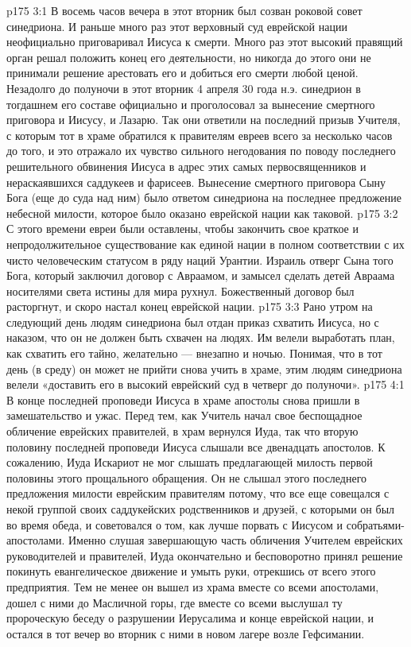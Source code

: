 \vs p175 3:1 В восемь часов вечера в этот вторник был созван роковой совет синедриона. И раньше много раз этот верховный суд еврейской нации неофициально приговаривал Иисуса к смерти. Много раз этот высокий правящий орган решал положить конец его деятельности, но никогда до этого они не принимали решение арестовать его и добиться его смерти любой ценой. Незадолго до полуночи в этот вторник 4 апреля 30 года н.э. синедрион в тогдашнем его составе официально и  проголосовал за вынесение смертного приговора и Иисусу, и Лазарю. Так они ответили на последний призыв Учителя, с которым тот в храме обратился к правителям евреев всего за несколько часов до того, и это отражало их чувство сильного негодования по поводу последнего решительного обвинения Иисуса в адрес этих самых первосвященников и нераскаявшихся саддукеев и фарисеев. Вынесение смертного приговора Сыну Бога (еще до суда над ним) было ответом синедриона на последнее предложение небесной милости, которое было оказано еврейской нации как таковой.
\vs p175 3:2 С этого времени евреи были оставлены, чтобы закончить свое краткое и непродолжительное существование как единой нации в полном соответствии с их чисто человеческим статусом в ряду наций Урантии. Израиль отверг Сына того Бога, который заключил договор с Авраамом, и замысел сделать детей Авраама носителями света истины для мира рухнул. Божественный договор был расторгнут, и скоро настал конец еврейской нации.
\vs p175 3:3 Рано утром на следующий день людям синедриона был отдан приказ схватить Иисуса, но с наказом, что он не должен быть схвачен на людях. Им велели выработать план, как схватить его тайно, желательно --- внезапно и ночью. Понимая, что в тот день (в среду) он может не прийти снова учить в храме, этим людям синедриона велели «доставить его в высокий еврейский суд в четверг до полуночи».
\vs p175 4:1 В конце последней проповеди Иисуса в храме апостолы снова пришли в замешательство и ужас. Перед тем, как Учитель начал свое беспощадное обличение еврейских правителей, в храм вернулся Иуда, так что вторую половину последней проповеди Иисуса слышали все двенадцать апостолов. К сожалению, Иуда Искариот не мог слышать предлагающей милость первой половины этого прощального обращения. Он не слышал этого последнего предложения милости еврейским правителям потому, что все еще совещался с некой группой своих саддукейских родственников и друзей, с которыми он был во время обеда, и советовался о том, как лучше порвать с Иисусом и собратьями\hyp{}апостолами. Именно слушая завершающую часть обличения Учителем еврейских руководителей и правителей, Иуда окончательно и бесповоротно принял решение покинуть евангелическое движение и умыть руки, отрекшись от всего этого предприятия. Тем не менее он вышел из храма вместе со всеми апостолами, дошел с ними до Масличной горы, где вместе со всеми выслушал ту пророческую беседу о разрушении Иерусалима и конце еврейской нации, и остался в тот вечер во вторник с ними в новом лагере возле Гефсимании.
